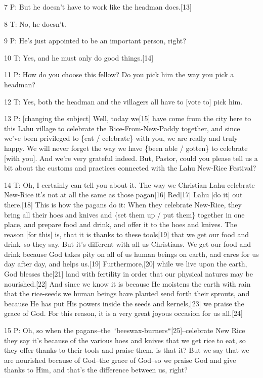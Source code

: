 7 P: But he doesn't have to work like the headman does.[13]

8 T: No, he doesn't.

9 P: He's just appointed to be an important person, right?

10 T: Yes, and he must only do good things.[14]

11 P: How do you choose this fellow? Do you pick him the way you pick a headman?

12 T: Yes, both the headman and the villagers all have to [vote to] pick him.

13 P: [changing the subject] Well, today we[15] have come from the city here to
this Lahu village to celebrate the Rice-From-New-Paddy together, and since we've
been privileged to \{eat / celebrate\} with you, we are really and truly happy.
We will never forget the way we have \{been able / gotten\} to celebrate [with
you]. And we're very grateful indeed. But, Pastor, could you please tell us a bit
about the customs and practices connected with the Lahu New-Rice Festival?

14 T: Oh, I certainly can tell you about it. The way we Christian Lahu celebrate
New-Rice it's not at all the same as those pagan[16] Red[17] Lahu [do it] out there.[18]
This is how the pagans do it: When they celebrate New-Rice, they bring all their
hoes and knives and \{set them up / put them\} together in one place, and prepare
food and drink, and offer it to the hoes and knives. The reason [for this] is,
that it is thanks to these tools[19] that we get our food and drink--so they say.
But it's different with all us Christians. We get our food and drink because God
takes pity on all of us human beings on earth, and cares for us day after day,
and helps us.[19] Furthermore,[20] while we live upon the earth, God blesses the[21]
land with fertility in order that our physical natures may be nourished.[22] And
since we know it is because He moistens the earth with rain that the rice-seeds
we human beings have planted send forth their sprouts, and because He has put His
powers inside the seeds and kernels,[23] we praise the grace of God. For this reason,
it is a very great joyous occasion for us all.[24]

15 P: Oh, so when the pagans--the \texttt{"}beeswax-burners\texttt{"}[25]--celebrate
New Rice they say it's because of the various hoes and knives that we get rice
to eat, so they offer thanks to their tools and praise them, is that it? But we
say that we are nourished because of God--the grace of God--so we praise God and
give thanks to Him, and that's the difference between us, right?


